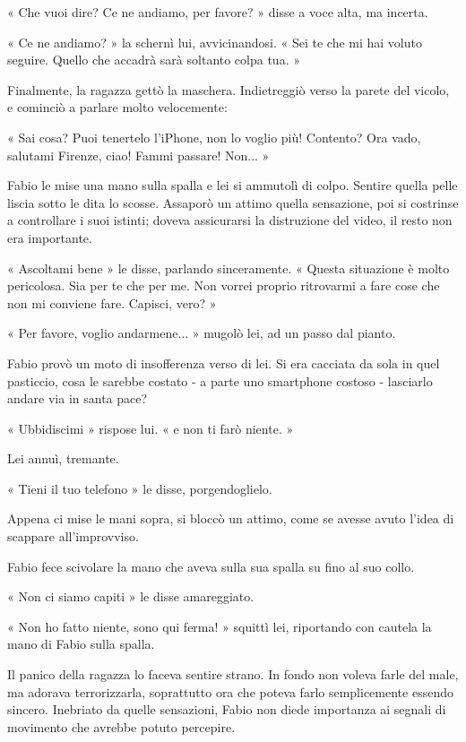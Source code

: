 « Che vuoi dire? Ce ne andiamo, per favore? » disse a voce alta, ma incerta.

« Ce ne andiamo? » la schernì lui, avvicinandosi. « Sei te che mi hai voluto seguire. Quello che accadrà sarà soltanto colpa tua. »

Finalmente, la ragazza gettò la maschera. Indietreggiò verso la parete del vicolo, e cominciò a parlare molto velocemente:

« Sai cosa? Puoi tenertelo l'iPhone, non lo voglio più! Contento? Ora vado, salutami Firenze, ciao! Fammi passare! Non... »

Fabio le mise una mano sulla spalla e lei si ammutolì di colpo. Sentire quella pelle liscia sotto le dita lo scosse. Assaporò un attimo quella sensazione, poi si costrinse a controllare i suoi istinti; doveva assicurarsi la distruzione del video, il resto non era importante.

« Ascoltami bene » le disse, parlando sinceramente. « Questa situazione è molto pericolosa. Sia per te che per me. Non vorrei proprio ritrovarmi a fare cose che non mi conviene fare. Capisci, vero? »

« Per favore, voglio andarmene... » mugolò lei, ad un passo dal pianto.

Fabio provò un moto di insofferenza verso di lei. Si era cacciata da sola in quel pasticcio, cosa le sarebbe costato - a parte uno smartphone costoso - lasciarlo andare via in santa pace?

« Ubbidiscimi » rispose lui. « e non ti farò niente. »

Lei annuì, tremante.

« Tieni il tuo telefono » le disse, porgendoglielo.

Appena ci mise le mani sopra, si bloccò un attimo, come se avesse avuto l'idea di scappare all'improvviso.

Fabio fece scivolare la mano che aveva sulla sua spalla su fino al suo collo.

« Non ci siamo capiti » le disse amareggiato.

« Non ho fatto niente, sono qui ferma! » squittì lei, riportando con cautela la mano di Fabio sulla spalla.

Il panico della ragazza lo faceva sentire strano. In fondo non voleva farle del male, ma adorava terrorizzarla, soprattutto ora che poteva farlo semplicemente essendo sincero. Inebriato da quelle sensazioni, Fabio non diede importanza ai segnali di movimento che avrebbe potuto percepire.

